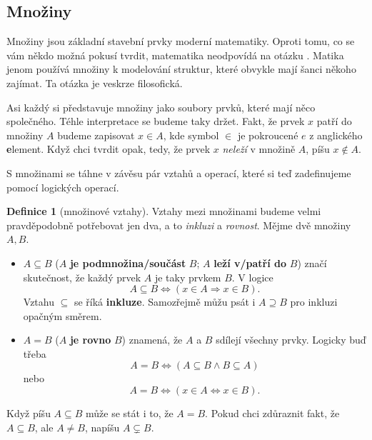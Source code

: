 \documentclass[a4paper,11pt]{article}
\theoremstyle{definition}
\newtheorem{dfn}[thm]{Definice}
\theoremstyle{plain}
\begin{document}
\subsection{Množiny}
\label{ssec:mnoziny}

Množiny jsou základní stavební prvky moderní matematiky. Oproti tomu, co se vám
někdo možná pokusí tvrdit, matematika neodpovídá na otázku .
Matika jenom používá množiny k modelování struktur, které obvykle mají šanci
někoho zajímat. Ta otázka je veskrze filosofická.

Asi každý si představuje množiny jako soubory prvků, které mají něco společného.
Téhle interpretace se budeme taky držet. Fakt, že prvek $x$ patří do množiny $A$
budeme zapisovat $x \in A$, kde symbol $ \in $ je pokroucené $e$ z anglického
\textbf{e}lement. Když chci tvrdit opak, tedy, že prvek $x$ \emph{neleží} v
množině $A$, píšu $x \notin A$.

S množinami se táhne v závěsu pár vztahů a operací, které si teď zadefinujeme
pomocí logických operací.

\begin{dfn}[množinové vztahy]
 Vztahy mezi množinami budeme velmi pravděpodobně potřebovat jen dva, a to
 \emph{inkluzi} a \emph{rovnost}. Mějme dvě množiny $A,B$.
 \begin{itemize}
  \item $A \subseteq B$ ($A$ \textbf{je podmnožina/součást} $B$; $A$ 
   \textbf{leží v/patří do} $B$) značí skutečnost, že každý prvek $A$ je taky
   prvkem $B$. V logice
   \[
    A \subseteq B \Leftrightarrow (x \in A \Rightarrow x \in B).
   \]
   Vztahu $ \subseteq $ se říká \textbf{inkluze}. Samozřejmě můžu psát i $A
   \supseteq B$ pro inkluzi opačným směrem.
  \item $A = B$ ($A$ \textbf{je rovno} $B$) znamená, že $A$ a $B$ sdílejí
   všechny prvky. Logicky buď třeba
   \[
    A = B \Leftrightarrow (A \subseteq B \wedge B \subseteq A)
   \]
   nebo
   \[
    A = B \Leftrightarrow (x \in A \Leftrightarrow x \in B).
   \]
 \end{itemize}
 Když píšu $A \subseteq B$ může se stát i to, že $A = B$. Pokud chci zdůraznit
 fakt, že $A \subseteq B$, ale $A \neq B$, napíšu $A \subsetneq B$.
\end{dfn}
\end{document}
